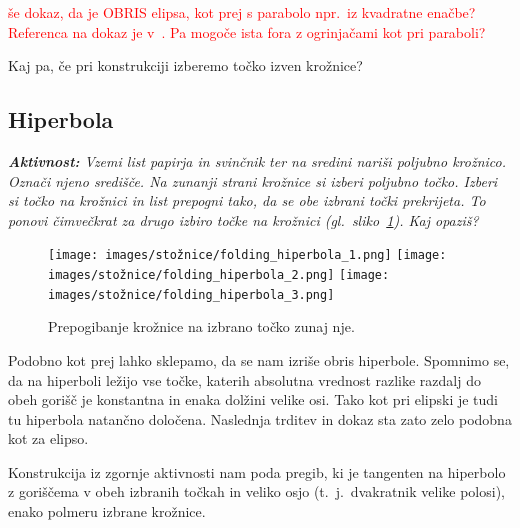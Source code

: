 \textcolor{red}{še dokaz, da je OBRIS elipsa, kot prej s parabolo npr.\ iz kvadratne enačbe? Referenca na dokaz je v~\cite[str.\ 60]{hull2013}. Pa mogoče ista fora z ogrinjačami kot pri paraboli?}

Kaj pa, če pri konstrukciji izberemo točko izven krožnice?

\subsection{Hiperbola}

\textit{\textbf{Aktivnost:} Vzemi list papirja in svinčnik ter na sredini nariši poljubno krožnico. Označi njeno središče. Na zunanji strani krožnice si izberi poljubno točko. Izberi si točko na krožnici in list prepogni tako, da se obe izbrani točki prekrijeta. To ponovi čimvečkrat za drugo izbiro točke na krožnici (gl.\ sliko~\ref{fig:koraki_hiperbola}). Kaj opaziš?}

\begin{figure}[h]
    \centering
    \texttt{[image: images/stožnice/folding\_hiperbola\_1.png]}
    \texttt{[image: images/stožnice/folding\_hiperbola\_2.png]}
    \texttt{[image: images/stožnice/folding\_hiperbola\_3.png]}
    \caption[Prepogibanje hiperbole]{Prepogibanje krožnice na izbrano točko zunaj nje.}
    \label{fig:koraki_hiperbola}
\end{figure}

Podobno kot prej lahko sklepamo, da se nam izriše obris hiperbole. Spomnimo se, da na hiperboli ležijo vse točke, katerih absolutna vrednost razlike razdalj do obeh gorišč je konstantna in enaka dolžini velike osi. Tako kot pri elipski je tudi tu hiperbola natančno določena. Naslednja trditev in dokaz sta zato zelo podobna kot za elipso.

\begin{trditev}
    Konstrukcija iz zgornje aktivnosti nam poda pregib, ki je tangenten na hiperbolo z goriščema v obeh izbranih točkah in veliko osjo (t.\ j.\ dvakratnik velike polosi), enako polmeru izbrane krožnice.
\end{trditev}

